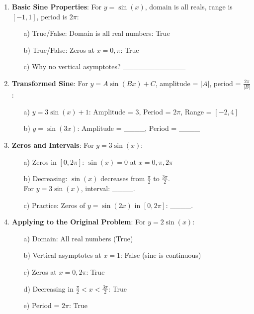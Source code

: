 \documentclass[12pt]{article}
\begin{document}
\begin{enumerate}[label=29.\arabic*]
    \item \textbf{Basic Sine Properties}: For \( y = \sin(x) \), domain is all reals, range is \([-1, 1]\), period is \( 2\pi \):
    \begin{enumerate}
        \item[a)] True/False: Domain is all real numbers: True
        \item[b)] True/False: Zeros at \( x = 0, \pi \): True
        \item[c)] Why no vertical asymptotes? \_\_\_\_\_\_\_\_\_\_\_\_
    \end{enumerate}
    \item \textbf{Transformed Sine}: For \( y = A\sin(Bx) + C \), amplitude = \( |A| \), period = \( \frac{2\pi}{|B|} \):
    \begin{enumerate}
        \item[a)] \( y = 3\sin(x) + 1 \): Amplitude = 3, Period = \( 2\pi \), Range = \([-2, 4]\)
        \item[b)] \( y = \sin(3x) \): Amplitude = \_\_\_\_, Period = \_\_\_\_
    \end{enumerate}
    \item \textbf{Zeros and Intervals}: For \( y = 3\sin(x) \):
    \begin{enumerate}
        \item[a)] Zeros in \([0, 2\pi]\): \( \sin(x) = 0 \) at \( x = 0, \pi, 2\pi \)
        \item[b)] Decreasing: \( \sin(x) \) decreases from \( \frac{\pi}{2} \) to \( \frac{3\pi}{2} \). \\
        For \( y = 3\sin(x) \), interval: \_\_\_\_.
        \item[c)] Practice: Zeros of \( y = \sin(2x) \) in \([0, 2\pi]\): \_\_\_\_.
    \end{enumerate}
    \item \textbf{Applying to the Original Problem}: For \( y = 2\sin(x) \):
    \begin{enumerate}
        \item[a)] Domain: All real numbers (True)
        \item[b)] Vertical asymptotes at \( x = 1 \): False (sine is continuous)
        \item[c)] Zeros at \( x = 0, 2\pi \): True
        \item[d)] Decreasing in \( \frac{\pi}{2} < x < \frac{3\pi}{2} \): True
        \item[e)] Period = \( 2\pi \): True
    \end{enumerate}
\end{enumerate}
\end{document}
